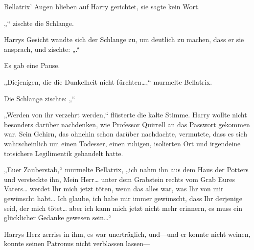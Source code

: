 Bellatrix' Augen blieben auf Harry gerichtet, sie sagte kein Wort.

„“ zischte die Schlange.

Harrys Gesicht wandte sich der Schlange zu, um deutlich zu machen, dass er sie ansprach, und zischte: „.“

Es gab eine Pause.

„Diejenigen, die die Dunkelheit nicht fürchten…,“ murmelte Bellatrix.

Die Schlange zischte: „“

„Werden von ihr verzehrt werden,“ flüsterte die kalte Stimme. Harry wollte nicht besonders darüber nachdenken, wie Professor Quirrell an das Passwort gekommen war. Sein Gehirn, das ohnehin schon darüber nachdachte, vermutete, dass es sich wahrscheinlich um einen Todesser, einen ruhigen, isolierten Ort und irgendeine totsichere Legilimentik gehandelt hatte.

„Euer Zauberstab,“ murmelte Bellatrix, „ich nahm ihn aus dem Haus der Potters und versteckte ihn, Mein Herr… unter dem Grabstein rechts vom Grab Eures Vaters… werdet Ihr mich jetzt töten, wenn das alles war, was Ihr von mir gewünscht habt… Ich glaube, ich habe mir immer gewünscht, dass Ihr derjenige seid, der mich tötet… aber ich kann mich jetzt nicht mehr erinnern, es muss ein glücklicher Gedanke gewesen sein…“

Harrys Herz zerriss in ihm, es war unerträglich, und—und er konnte nicht weinen, konnte seinen Patronus nicht verblassen lassen—

